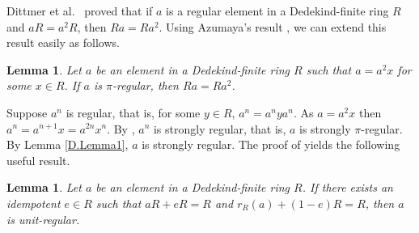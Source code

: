 \documentclass[12pt]{article}
\makeatletter
\theoremstyle{plain}
\newtheorem{lemma}[thm]{Lemma}
\theoremstyle{definition}
\renewenvironment{proof}[1][\proofname]{%
	\par\pushQED{\qed}%
	\normalfont %
	\topsep6\p@\@plus6\p@\relax
	\trivlist
	\item[\hskip\labelsep\bfseries #1\@addpunct{.}]%
}{%
	\popQED\endtrivlist\@endpefalse
}
\renewcommand{\proofname}{Proof}
\makeatother
\begin{document}
	Dittmer et al.\ \cite[Lemma~3.3]{Dit} proved that if $a$ is a regular element in a Dedekind-finite ring $R$ and $aR = a^{2}R$, then $Ra = Ra^{2}$. Using Azumaya's result \cite[Lemma~3]{Az}, we can extend this result easily as follows.
	
	
	\begin{lemma}\label{D.Nasc2}
		Let $a$ be an element in a Dedekind-finite ring $R$ such that $a = a^2x$ for some $x \in R$. If $a$ is $\pi$-regular, then $Ra=Ra^2$.
	\end{lemma}
	\begin{proof}
		Suppose $a^n$ is regular, that is, for some $y \in R$, $a^n=a^nya^n$. As $a=a^2x$ then $a^n=a^{n+1}x=a^{2n}x^n$. By \cite[Lemma 3.3]{Dit}, $a^n$ is strongly regular, that is, $a$ is strongly $\pi$-regular. By Lemma \ref{D.Lemma1}, $a$ is strongly regular.
	\end{proof}
	The proof of \cite[Theorem 3.4]{Dit} yields the following useful result.
	\begin{lemma}\label{D.DKP}
		Let $a$ be an element in a Dedekind-finite ring $R$. If there exists an idempotent $e\in R$ such that $aR + eR = R$ and $r_R(a) + (1-e)R = R$, then $a$ is unit-regular.
	\end{lemma}
	
\end{document}
